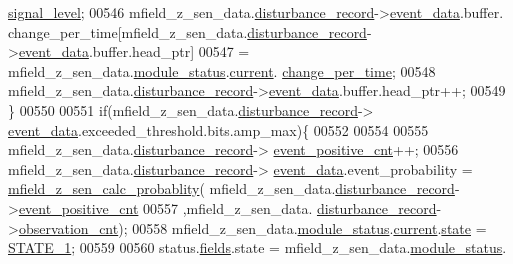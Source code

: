 \begin{DoxyCode}
      \hyperlink{a00019_a4070db8eab0ff93e3fbc1df59872f117}{signal\_level};
00546             mfield\_z\_sen\_data.\hyperlink{a00027_ac9b38e2c1d3f1013a88d33506c754152}{disturbance\_record}->\hyperlink{a00028_a8c0bda69e71ef674e60da47ad0be9ab0}{event\_data}.buffer.
      change\_per\_time[mfield\_z\_sen\_data.\hyperlink{a00027_ac9b38e2c1d3f1013a88d33506c754152}{disturbance\_record}->\hyperlink{a00028_a8c0bda69e71ef674e60da47ad0be9ab0}{event\_data}.buffer.head\_ptr]
00547                     = mfield\_z\_sen\_data.\hyperlink{a00027_adfab5a5d8b45a93dfb13edb24e2b80e3}{module\_status}.\hyperlink{a00019_acf41ffc11da291c2f9f0fcb02ee72b98}{current}.
      \hyperlink{a00019_a0f645dd76b41adc6a966feba8e4bff8c}{change\_per\_time};
00548             mfield\_z\_sen\_data.\hyperlink{a00027_ac9b38e2c1d3f1013a88d33506c754152}{disturbance\_record}->\hyperlink{a00028_a8c0bda69e71ef674e60da47ad0be9ab0}{event\_data}.buffer.head\_ptr++;
00549             \}
00550 
00551              \textcolor{keywordflow}{if}(mfield\_z\_sen\_data.\hyperlink{a00027_ac9b38e2c1d3f1013a88d33506c754152}{disturbance\_record}->
      \hyperlink{a00028_a8c0bda69e71ef674e60da47ad0be9ab0}{event\_data}.exceeded\_threshold.bits.amp\_max)\{
00552 
00554 
00555                mfield\_z\_sen\_data.\hyperlink{a00027_ac9b38e2c1d3f1013a88d33506c754152}{disturbance\_record}->
      \hyperlink{a00028_a7397b9d76d4b57500f27bb23d258a18a}{event\_positive\_cnt}++;
00556                mfield\_z\_sen\_data.\hyperlink{a00027_ac9b38e2c1d3f1013a88d33506c754152}{disturbance\_record}->
      \hyperlink{a00028_a8c0bda69e71ef674e60da47ad0be9ab0}{event\_data}.event\_probability = \hyperlink{a00053_a8a5c3986dbe778d199b6e3b485f7a34b}{mfield\_z\_sen\_calc\_probablity}(
      mfield\_z\_sen\_data.\hyperlink{a00027_ac9b38e2c1d3f1013a88d33506c754152}{disturbance\_record}->\hyperlink{a00028_a7397b9d76d4b57500f27bb23d258a18a}{event\_positive\_cnt}
00557                                                                                     ,mfield\_z\_sen\_data.
      \hyperlink{a00027_ac9b38e2c1d3f1013a88d33506c754152}{disturbance\_record}->\hyperlink{a00028_ad5b0bac02ce266b91b2b52a1c3ea1d78}{observation\_cnt});
00558                mfield\_z\_sen\_data.\hyperlink{a00027_adfab5a5d8b45a93dfb13edb24e2b80e3}{module\_status}.\hyperlink{a00019_acf41ffc11da291c2f9f0fcb02ee72b98}{current}.\hyperlink{a00019_a6b8d8e916bc56265a3fd279bd26b6d1b}{state} = 
      \hyperlink{a00021_a727351838367f27ac0adb9a13422c342}{STATE\_1};
00559 
00560                status.\hyperlink{a00021_a5296d090c085b0421fdf5a86e382abea}{fields}.state = mfield\_z\_sen\_data.\hyperlink{a00027_adfab5a5d8b45a93dfb13edb24e2b80e3}{module\_status}.

\end{DoxyCode}
